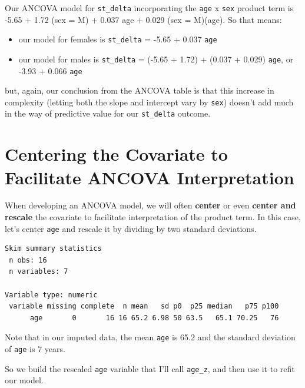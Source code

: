 \documentclass[]{book}
\newenvironment{Shaded}{\begin{snugshade}}{\end{snugshade}}
\newcommand{\KeywordTok}[1]{\textcolor[rgb]{0.13,0.29,0.53}{\textbf{#1}}}
\newcommand{\StringTok}[1]{\textcolor[rgb]{0.31,0.60,0.02}{#1}}
\newcommand{\OperatorTok}[1]{\textcolor[rgb]{0.81,0.36,0.00}{\textbf{#1}}}
\newcommand{\NormalTok}[1]{#1}
\providecommand{\tightlist}{%
  \setlength{\itemsep}{0pt}\setlength{\parskip}{0pt}}
\theoremstyle{definition}
\theoremstyle{definition}
\theoremstyle{definition}
\theoremstyle{remark}
\begin{document}
Our ANCOVA model for \texttt{st\_delta} incorporating the \texttt{age} x
\texttt{sex} product term is -5.65 + 1.72 (sex = M) + 0.037 age + 0.029
(sex = M)(age). So that means:

\begin{itemize}
\tightlist
\item
  our model for females is \texttt{st\_delta} = -5.65 + 0.037
  \texttt{age}
\item
  our model for males is \texttt{st\_delta} = (-5.65 + 1.72) + (0.037 +
  0.029) \texttt{age}, or -3.93 + 0.066 \texttt{age}
\end{itemize}

but, again, our conclusion from the ANCOVA table is that this increase
in complexity (letting both the slope and intercept vary by
\texttt{sex}) doesn't add much in the way of predictive value for our
\texttt{st\_delta} outcome.

\section{Centering the Covariate to Facilitate ANCOVA
Interpretation}\label{centering-the-covariate-to-facilitate-ancova-interpretation}

When developing an ANCOVA model, we will often \textbf{center} or even
\textbf{center and rescale} the covariate to facilitate interpretation
of the product term. In this case, let's center \texttt{age} and rescale
it by dividing by two standard deviations.

\begin{Shaded}
\end{Shaded}

\begin{verbatim}
Skim summary statistics
 n obs: 16 
 n variables: 7 

Variable type: numeric 
 variable missing complete  n mean   sd p0  p25 median   p75 p100
      age       0       16 16 65.2 6.98 50 63.5   65.1 70.25   76
\end{verbatim}

Note that in our imputed data, the mean \texttt{age} is 65.2 and the
standard deviation of \texttt{age} is 7 years.

So we build the rescaled \texttt{age} variable that I'll call
\texttt{age\_z}, and then use it to refit our model.
\end{document}
